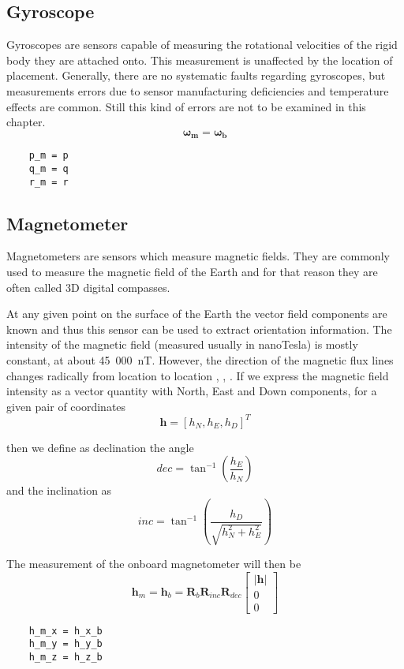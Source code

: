 \subsection{Gyroscope}
Gyroscopes are sensors capable of measuring the rotational velocities of the rigid body they are attached onto. This measurement is unaffected by the location of placement. Generally, there are no systematic faults regarding gyroscopes, but measurements errors due to sensor manufacturing deficiencies and temperature effects are common. Still this kind of errors are not to be examined in this chapter.
\begin{equation}
	\bm{\omega_m} = \bm{\omega_b}
\end{equation}
%
\begin{lstlisting}
	p_m = p
	q_m = q
	r_m = r
\end{lstlisting}

\subsection{Magnetometer}
Magnetometers are sensors which measure magnetic fields. They are commonly used to measure the magnetic field of the Earth and for that reason they are often called 3D digital compasses.

At any given point on the surface of the Earth the vector field components are known and thus this sensor can be used to extract orientation information. The intensity of the magnetic field (measured usually in nanoTesla) is mostly constant, at about 45~000~nT. However, the direction of the magnetic flux lines changes radically from location to location \cite{wiki:declination}, \cite{wiki:inclination}, \cite{NOAAGeom}. If we express the magnetic field intensity as a vector quantity with North, East and Down components, for a given pair of coordinates
\begin{equation}
\bm{h} = [h_N, h_E, h_D]^T
\end{equation}

then we define as declination the angle
\begin{equation}
	dec = \tan^{-1}\left(\frac{h_E}{h_N}\right)
\end{equation}
and the inclination as
\begin{equation}
	inc = \tan^{-1}\left(\frac{h_D}{\sqrt{h_N^2 + h_E^2}}\right)
\end{equation}

The measurement of the onboard magnetometer will then be
\begin{equation} \label{eq:magField}
	\bm{h}_m = \bm{h}_b =\bm{R}_b \bm{R}_{inc}\bm{R}_{dec} \begin{bmatrix}
			\lvert \bm{h} \rvert \\ 0 \\ 0
	\end{bmatrix}
\end{equation}
%
\begin{lstlisting}
	h_m_x = h_x_b
	h_m_y = h_y_b
	h_m_z = h_z_b	
\end{lstlisting}

